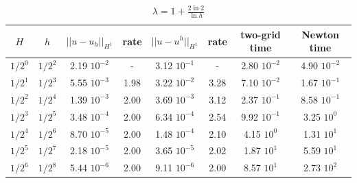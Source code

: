\documentclass[12pt]{amsart}
\numberwithin{equation}{section}
\begin{document}
\begin{table} 
\begin{tabular}{|c|c|c|c|c|c|c|c|} \hline
$H$ & $h$ &$||u-u_h||_{H^1}$ & rate & $||u-u^h||_{H^1}$ & rate & two-grid time & Newton time\\ \hline
$1/2^0$ & $1/2^2$ &2.19 $10^{-2}$ & -       & 3.12 $10^{-1}$ & -             & 2.80 $10^{-2}$& 4.90 $10^{-2}$ \\ \hline
$1/2^1$ &$1/2^3$ & 5.55 $10^{-3}$ & 1.98 & 3.22 $10^{-2}$ & 3.28 & 7.10 $10^{-2}$ & 1.67 $10^{-1}$ \\ \hline
$1/2^2$ &$1/2^4$ &1.39 $10^{-3}$ &2.00   & 3.69 $10^{-3}$ & 3.12 & 2.37 $10^{-1}$ &8.58 $10^{-1}$\\ \hline
$1/2^3$ & $1/2^5$ &3.48 $10^{-4}$ & 2.00 & 6.34 $10^{-4}$ & 2.54 & 9.92 $10^{-1}$&3.25 $10^{0}$\\ \hline
$1/2^4$ & $1/2^6$ & 8.70 $10^{-5}$ & 2.00& 1.48 $10^{-4}$ & 2.10 & 4.15 $10^{0}$ & 1.31 $10^{1}$\\ \hline
$1/2^5$ & $1/2^7$ & 2.18 $10^{-5}$ &2.00 & 3.65 $10^{-5}$ & 2.02 & 1.87 $10^{1}$& 5.59 $10^{1}$\\ \hline
$1/2^6$ & $1/2^8$ & 5.44 $10^{-6}$ & 2.00 & 9.11 $10^{-6}$ & 2.00 &8.57 $10^{1}$& 2.73 $10^{2}$\\ \hline
\end{tabular}
\caption{ $\lambda=1+ \frac{2 \ln 2}{\ln h} $} \label{tab1}
\end{table}
\end{document}
